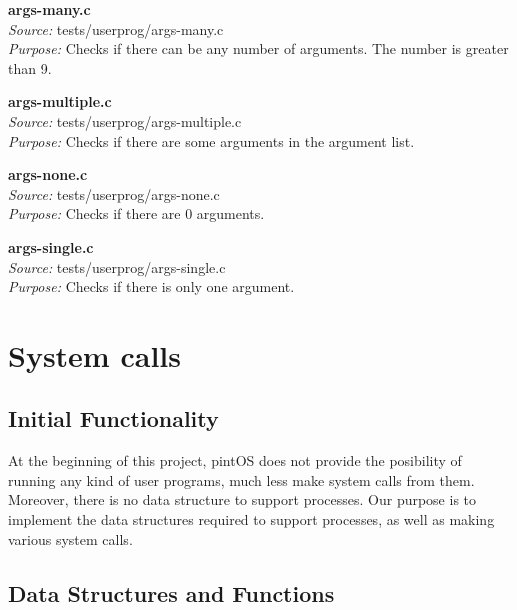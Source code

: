       \textbf{args-many.c}\\
      \textit{Source:} tests/userprog/args-many.c\\
      \textit{Purpose:} Checks if there can be any number of arguments. 
	  The number is greater than 9.

    \textbf{args-multiple.c} \\
    \textit{Source:} tests/userprog/args-multiple.c\\
    \textit{Purpose:} Checks if there are some arguments in 
	  the argument list.

    \textbf{args-none.c}\\
    \textit{Source:} tests/userprog/args-none.c\\
    \textit{Purpose:} Checks if there are 0 arguments.

    \textbf{args-single.c}\\
    \textit{Source:} tests/userprog/args-single.c\\
    \textit{Purpose:} Checks if there is only one argument.\\
    
\section{System calls}

    \subsection{Initial Functionality}

	At the beginning of this project, pintOS does not provide the posibility of running any kind of user programs, much less make system calls from them. Moreover, there is no data structure to support processes. Our purpose is to implement the data structures required to support processes, as well as making various system calls.
  
    \subsection{Data Structures and Functions}


